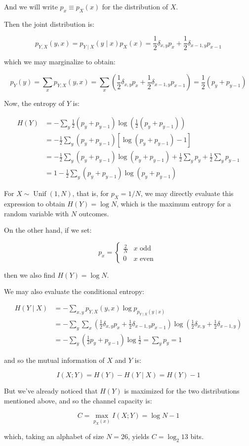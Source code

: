 \documentclass[10pt]{article}
\begin{document}
And we will write $p_{x} \equiv p_{X}(x)$ for the distribution of $X$.

Then the joint distribution is:

$$
p_{Y, X}(y, x)=p_{Y \mid X}(y \mid x) p_{X}(x)=\frac{1}{2} \delta_{x, y} p_{x}+\frac{1}{2} \delta_{x-1, y} p_{x-1}
$$

which we may marginalize to obtain:

$$
p_{Y}(y)=\sum_{x} p_{Y, X}(y, x)=\sum_{x}\left(\frac{1}{2} \delta_{x, y} p_{x}+\frac{1}{2} \delta_{x-1, y} p_{x-1}\right)=\frac{1}{2}\left(p_{y}+p_{y-1}\right)
$$

Now, the entropy of $Y$ is:

$$
\begin{aligned}
H(Y) & =-\sum_{y} \frac{1}{2}\left(p_{y}+p_{y-1}\right) \log \left(\frac{1}{2}\left(p_{y}+p_{y-1}\right)\right) \\
& =-\frac{1}{2} \sum_{y}\left(p_{y}+p_{y-1}\right)\left[\log \left(p_{y}+p_{y-1}\right)-1\right] \\
& =-\frac{1}{2} \sum_{y}\left(p_{y}+p_{y-1}\right) \log \left(p_{y}+p_{y-1}\right)+\frac{1}{2} \sum_{y} p_{y}+\frac{1}{2} \sum_{y} p_{y-1} \\
& =1-\frac{1}{2} \sum_{y}\left(p_{y}+p_{y-1}\right) \log \left(p_{y}+p_{y-1}\right)
\end{aligned}
$$

For $X \sim \operatorname{Unif}(1, N)$, that is, for $p_{X}=1 / N$, we may directly evaluate this expression to obtain $H(Y)=\log N$, which is the maximum entropy for a random variable with $N$ outcomes.

On the other hand, if we set:

$$
p_{x}= \begin{cases}\frac{2}{N} & x \text { odd } \\ 0 & x \text { even }\end{cases}
$$

then we also find $H(Y)=\log N$.

We may also evaluate the conditional entropy:

$$
\begin{aligned}
H(Y \mid X) & =-\sum_{x, y} p_{Y, X}(y, x) \log p_{p_{Y \mid X}(y \mid x)} \\
& =-\sum_{y} \sum_{x}\left(\frac{1}{2} \delta_{x, y} p_{x}+\frac{1}{2} \delta_{x-1, y} p_{x-1}\right) \log \left(\frac{1}{2} \delta_{x, y}+\frac{1}{2} \delta_{x-1, y}\right) \\
& =-\sum_{y}\left(\frac{1}{2} p_{y}+p_{y-1}\right) \log \frac{1}{2}=\sum_{y} p_{y}=1
\end{aligned}
$$

and so the mutual information of $X$ and $Y$ is:

$$
I(X ; Y)=H(Y)-H(Y \mid X)=H(Y)-1
$$

But we've already noticed that $H(Y)$ is maximized for the two distributions mentioned above, and so the channel capacity is:

$$
C=\max _{p_{X}(x)} I(X ; Y)=\log N-1
$$

which, taking an alphabet of size $N=26$, yields $C=\log _{2} 13$ bits.
\end{document}
